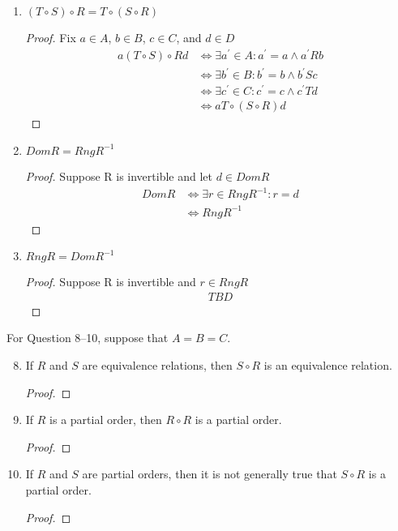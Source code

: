 \documentclass{article}
\begin{document}
\begin{enumerate}
    \item $(T \circ S) \circ R = T \circ (S \circ R)$
      \begin{proof}
        Fix $a\in A$, $b\in B$, $c\in C$, and $d\in D$
        \begin{align*}
          a(T\circ S)\circ Rd &\iff \exists a^{'}\in A: a^{'}=a \wedge a^{'}Rb \\
          &\iff \exists b^{'}\in B: b^{'}=b \wedge b^{'}Sc \\
          &\iff \exists c^{'}\in C: c^{'}=c \wedge c^{'}Td \\
          &\iff aT\circ(S\circ R)d
        \end{align*}
      \end{proof}
    \item $Dom R = Rng R^{-1}$
      \begin{proof}
        Suppose R is invertible and let $d\in DomR$
        \begin{align*}
          Dom R &\iff \exists r\in RngR^{-1}: r = d \\
          &\iff RngR^{-1}
        \end{align*}
      \end{proof}
    \item $Rng R = Dom R^{-1}$
      \begin{proof}
        Suppose R is invertible and $r\in Rng R$
        \begin{align*}
TBD
        \end{align*}
      \end{proof}
  \end{enumerate}
  For Question 8–10, suppose that $A = B = C$.
  \begin{enumerate} \setcounter{enumi}{7}
    \item If $R$ and $S$ are equivalence relations, then $S \circ R$ is an equivalence relation.
      \begin{proof}
        
      \end{proof}
    \item If $R$ is a partial order, then $R \circ R$ is a partial order.
      \begin{proof}
        
      \end{proof}
    \item If $R$ and $S$ are partial orders, then it is not generally true that $S \circ R$ is a partial order.
      \begin{proof}
        
      \end{proof}
  \end{enumerate}
\end{document}
